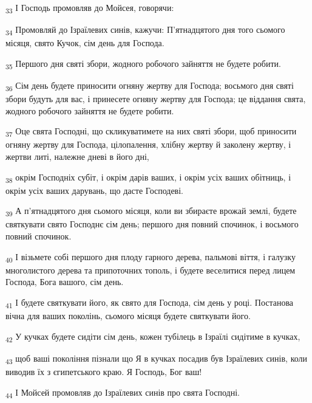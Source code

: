 \begin{tcolorbox}
\textsubscript{33} І Господь промовляв до Мойсея, говорячи:
\end{tcolorbox}
\begin{tcolorbox}
\textsubscript{34} Промовляй до Ізраїлевих синів, кажучи: П'ятнадцятого дня того сьомого місяця, свято Кучок, сім день для Господа.
\end{tcolorbox}
\begin{tcolorbox}
\textsubscript{35} Першого дня святі збори, жодного робочого зайняття не будете робити.
\end{tcolorbox}
\begin{tcolorbox}
\textsubscript{36} Сім день будете приносити огняну жертву для Господа; восьмого дня святі збори будуть для вас, і принесете огняну жертву для Господа; це віддання свята, жодного робочого зайняття не будете робити.
\end{tcolorbox}
\begin{tcolorbox}
\textsubscript{37} Оце свята Господні, що скликуватимете на них святі збори, щоб приносити огняну жертву для Господа, цілопалення, хлібну жертву й заколену жертву, і жертви литі, належне дневі в його дні,
\end{tcolorbox}
\begin{tcolorbox}
\textsubscript{38} окрім Господніх субіт, і окрім дарів ваших, і окрім усіх ваших обітниць, і окрім усіх ваших дарувань, що дасте Господеві.
\end{tcolorbox}
\begin{tcolorbox}
\textsubscript{39} А п'ятнадцятого дня сьомого місяця, коли ви збираєте врожай землі, будете святкувати свято Господнє сім день; першого дня повний спочинок, і восьмого повний спочинок.
\end{tcolorbox}
\begin{tcolorbox}
\textsubscript{40} І візьмете собі першого дня плоду гарного дерева, пальмові віття, і галузку многолистого дерева та припоточних тополь, і будете веселитися перед лицем Господа, Бога вашого, сім день.
\end{tcolorbox}
\begin{tcolorbox}
\textsubscript{41} І будете святкувати його, як свято для Господа, сім день у році. Постанова вічна для ваших поколінь, сьомого місяця будете святкувати його.
\end{tcolorbox}
\begin{tcolorbox}
\textsubscript{42} У кучках будете сидіти сім день, кожен тубілець в Ізраїлі сидітиме в кучках,
\end{tcolorbox}
\begin{tcolorbox}
\textsubscript{43} щоб ваші покоління пізнали що Я в кучках посадив був Ізраїлевих синів, коли виводив їх з єгипетського краю. Я Господь, Бог ваш!
\end{tcolorbox}
\begin{tcolorbox}
\textsubscript{44} І Мойсей промовляв до Ізраїлевих синів про свята Господні.
\end{tcolorbox}
